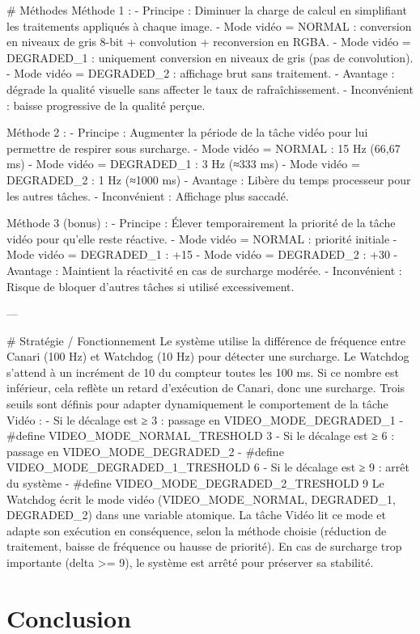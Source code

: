 \documentclass[a4paper,12pt]{article}
\begin{document}
# Méthodes
Méthode 1 :
- Principe : Diminuer la charge de calcul en simplifiant les traitements appliqués à chaque image.
- Mode vidéo = NORMAL : conversion en niveaux de gris 8-bit + convolution + reconversion en RGBA.
- Mode vidéo = DEGRADED_1 : uniquement conversion en niveaux de gris (pas de convolution).
- Mode vidéo = DEGRADED_2 : affichage brut sans traitement.
- Avantage : dégrade la qualité visuelle sans affecter le taux de rafraîchissement.
- Inconvénient : baisse progressive de la qualité perçue.

Méthode 2 :
- Principe : Augmenter la période de la tâche vidéo pour lui permettre de respirer sous surcharge.
- Mode vidéo = NORMAL : 15 Hz (66,67 ms)
- Mode vidéo = DEGRADED_1 : 3 Hz (≈333 ms)
- Mode vidéo = DEGRADED_2 : 1 Hz (≈1000 ms)
- Avantage : Libère du temps processeur pour les autres tâches.
- Inconvénient : Affichage plus saccadé.

Méthode 3 (bonus) :
- Principe : Élever temporairement la priorité de la tâche vidéo pour qu’elle reste réactive.
- Mode vidéo = NORMAL : priorité initiale
- Mode vidéo = DEGRADED_1 : +15
- Mode vidéo = DEGRADED_2 : +30
- Avantage : Maintient la réactivité en cas de surcharge modérée.
- Inconvénient : Risque de bloquer d’autres tâches si utilisé excessivement.

---

# Stratégie / Fonctionnement
Le système utilise la différence de fréquence entre Canari (100 Hz) et Watchdog (10 Hz) pour détecter une surcharge. Le Watchdog s’attend à un incrément de 10 du compteur toutes les 100 ms. Si ce nombre est inférieur, cela reflète un retard d’exécution de Canari, donc une surcharge.
Trois seuils sont définis pour adapter dynamiquement le comportement de la tâche Vidéo :
- Si le décalage est ≥ 3 : passage en VIDEO_MODE_DEGRADED_1
    - #define VIDEO_MODE_NORMAL_TRESHOLD      3
- Si le décalage est ≥ 6 : passage en VIDEO_MODE_DEGRADED_2
    - #define VIDEO_MODE_DEGRADED_1_TRESHOLD  6
- Si le décalage est ≥ 9 : arrêt du système
    - #define VIDEO_MODE_DEGRADED_2_TRESHOLD  9
Le Watchdog écrit le mode vidéo (VIDEO_MODE_NORMAL, DEGRADED_1, DEGRADED_2) dans une variable atomique. La tâche Vidéo lit ce mode et adapte son exécution en conséquence, selon la méthode choisie (réduction de traitement, baisse de fréquence ou hausse de priorité).
En cas de surcharge trop importante (delta >= 9), le système est arrêté pour préserver sa stabilité.

\newpage

\section{Conclusion}
\end{document}

